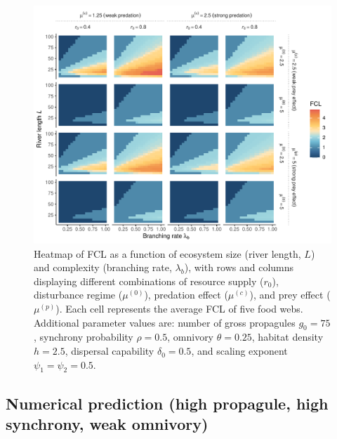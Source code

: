 \begin{figure}
\centering
\includegraphics{../data_fmt/fig_rho05_g75_theta025.pdf}
\caption{Heatmap of FCL as a function of ecosystem size (river length,
\(L\)) and complexity (branching rate, \(\lambda_b\)), with rows and
columns displaying different combinations of resource supply (\(r_0\)),
disturbance regime (\(\mu^{(0)}\)), predation effect (\(\mu^{(c)}\)),
and prey effect (\(\mu^{(p)}\)). Each cell represents the average FCL of
five food webs. Additional parameter values are: number of gross
propagules \(g_0=75\), synchrony probability \(\rho=0.5\), omnivory
\(\theta=0.25\), habitat density \(h=2.5\), dispersal capability
\(\delta_0=0.5\), and scaling exponent \(\psi_1=\psi_2=0.5\).}
\end{figure}

\newpage

\subsection*{Numerical prediction (high propagule, high synchrony, weak
omnivory)}\label{numerical-prediction-high-propagule-high-synchrony-weak-omnivory}

